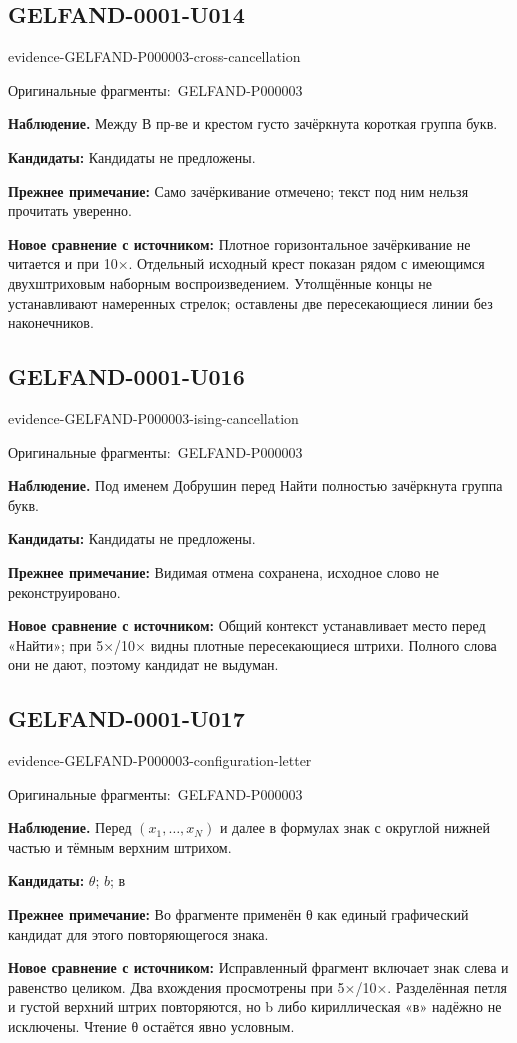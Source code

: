 \documentclass[11pt]{article}
\newcommand{\EvidenceBlock}[4]{%
 \par\smallskip\noindent\begin{minipage}{\linewidth}
 \begin{minipage}[t]{.47\linewidth}\vspace{0pt}\centering
 \csname evidence-#1-#2\endcsname\par
 {\scriptsize\SourceCropCaption\ #1}\par
 \end{minipage}\hfill
 \begin{minipage}[t]{.49\linewidth}\vspace{0pt}\raggedright
 {\small\color{orange!65!black}\textbf{#4} #3}\par
 \end{minipage}
 \end{minipage}\par\smallskip}
\newcommand{\SourceCropCaption}{Оригинальные фрагменты:}\newcommand{\ReadingCaption}{Сомнительное чтение.}\newcommand{\IncompleteCaption}{Неразобранный фрагмент.}\newcommand{\DiagramCaption}{Рисунок и набранное описание.}
\begin{document}
\subsection*{GELFAND-0001-U014}
\EvidenceBlock{GELFAND-P000003}{cross-cancellation}{Между В пр-ве и крестом густо зачёркнута короткая группа букв.}{Наблюдение.}
\par\smallskip\noindent\textbf{Кандидаты: } Кандидаты не предложены.\par
\par\smallskip\noindent\textbf{Прежнее примечание: } Само зачёркивание отмечено; текст под ним нельзя прочитать уверенно.\par
\par\smallskip\noindent\textbf{Новое сравнение с источником: } Плотное горизонтальное зачёркивание не читается и при 10×. Отдельный исходный крест показан рядом с имеющимся двухштриховым наборным воспроизведением. Утолщённые концы не устанавливают намеренных стрелок; оставлены две пересекающиеся линии без наконечников.\par

\subsection*{GELFAND-0001-U016}
\EvidenceBlock{GELFAND-P000003}{ising-cancellation}{Под именем Добрушин перед Найти полностью зачёркнута группа букв.}{Наблюдение.}
\par\smallskip\noindent\textbf{Кандидаты: } Кандидаты не предложены.\par
\par\smallskip\noindent\textbf{Прежнее примечание: } Видимая отмена сохранена, исходное слово не реконструировано.\par
\par\smallskip\noindent\textbf{Новое сравнение с источником: } Общий контекст устанавливает место перед «Найти»; при 5×/10× видны плотные пересекающиеся штрихи. Полного слова они не дают, поэтому кандидат не выдуман.\par

\subsection*{GELFAND-0001-U017}
\EvidenceBlock{GELFAND-P000003}{configuration-letter}{Перед \((x_1,\ldots,x_N)\) и далее в формулах знак с округлой нижней частью и тёмным верхним штрихом.}{Наблюдение.}
\par\smallskip\noindent\textbf{Кандидаты: } \(\theta\); \(b\); в\par
\par\smallskip\noindent\textbf{Прежнее примечание: } Во фрагменте применён θ как единый графический кандидат для этого повторяющегося знака.\par
\par\smallskip\noindent\textbf{Новое сравнение с источником: } Исправленный фрагмент включает знак слева и равенство целиком. Два вхождения просмотрены при 5×/10×. Разделённая петля и густой верхний штрих повторяются, но b либо кириллическая «в» надёжно не исключены. Чтение θ остаётся явно условным.\par
\end{document}
